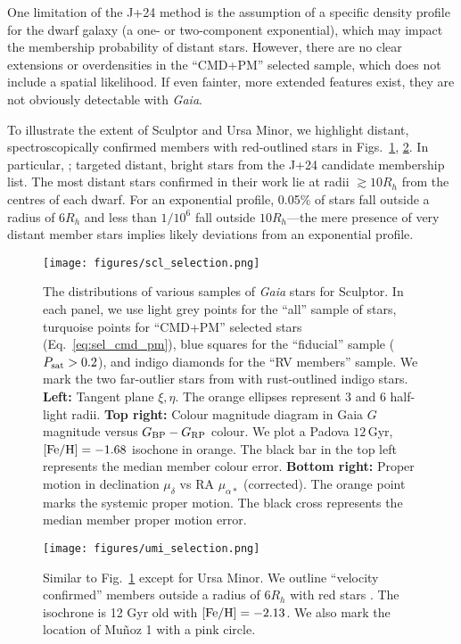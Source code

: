 One limitation of the J+24 method is the assumption of a specific
density profile for the dwarf galaxy (a one- or two-component
exponential), which may impact the membership probability of distant
stars. However, there are no clear extensions or overdensities in the
``CMD+PM'' selected sample, which does not include a spatial likelihood.
If even fainter, more extended features exist, they are not obviously
detectable with \emph{Gaia}.

To illustrate the extent of Sculptor and Ursa Minor, we highlight
distant, spectroscopically confirmed members with red-outlined stars in
Figs.~\ref{fig:scl_selection}, \ref{fig:umi_selection}. In particular,
\citet{sestito+2023a}; \citet{sestito+2023b} targeted distant, bright
stars from the J+24 candidate membership list. The most distant stars
confirmed in their work lie at radii \(\gtrsim 10 R_h\) from the centres
of each dwarf. For an exponential profile, 0.05\% of stars fall outside
a radius of \(6R_h\) and less than \(1/10^6\) fall outside
\(10R_h\)---the mere presence of very distant member stars implies
likely deviations from an exponential profile.

\begin{figure}
\centering
\texttt{[image: figures/scl\_selection.png]}
\caption[Sculptor sample selection]{The distributions of various samples
of \emph{Gaia} stars for Sculptor. In each panel, we use light grey
points for the ``all'' sample of stars, turquoise points for ``CMD+PM''
selected stars (Eq.~\ref{eq:sel_cmd_pm}), blue squares for the
``fiducial'' sample (\(P_{\rm sat} > 0.2\)), and indigo diamonds for the
``RV members'' sample. We mark the two far-outlier stars from
\citet{sestito+2023a} with rust-outlined indigo stars. \textbf{Left:}
Tangent plane \(\xi, \eta\). The orange ellipses represent 3 and 6
half-light radii. \textbf{Top right:} Colour magnitude diagram in Gaia
\(G\) magnitude versus \(G_{\rm BP} - G_{\rm RP}\) colour. We plot a
Padova \(12\,\)Gyr, \({\rm [Fe/H] }=-1.68\) isochone in orange. The
black bar in the top left represents the median member colour error.
\textbf{Bottom right:} Proper motion in declination \(\mu_\delta\) vs RA
\(\mu_{\alpha*}\) (corrected). The orange point marks the systemic
\citet{MV2020b} proper motion. The black cross represents the median
member proper motion error.}\label{fig:scl_selection}
\end{figure}

\begin{figure}
\centering
\texttt{[image: figures/umi\_selection.png]}
\caption[Ursa Minor sample selection]{Similar to
Fig.~\ref{fig:scl_selection} except for Ursa Minor. We outline
``velocity confirmed'' members outside a radius of \(6R_h\) with red
stars \citep[from][]{sestito+2023b, pace+2020, spencer+2018}. The
isochrone is 12 Gyr old with \({\rm [Fe/H]} = -2.13\). We also mark the
location of Muñoz 1 with a pink circle.}\label{fig:umi_selection}
\end{figure}

